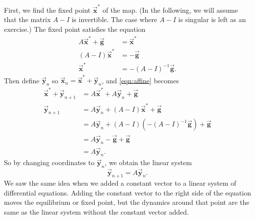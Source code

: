 \documentclass[reqno]{immbook}
\newcommand{\BG}{\vec{\textbf{g}}}
\newcommand{\BX}{\vec{\textbf{x}}}
\newcommand{\BY}{\vec{\textbf{y}}}
\numberwithin{equation}{chapter}
\numberwithin{question}{section}
\numberwithin{theorem}{chapter}
\numberwithin{figure}{chapter}
\theoremstyle{definition}
\begin{document}
First, we find the fixed point $\BX^*$ of the map.
(In the following, we will assume that 
the matrix $A-I$ is invertible.  The case
where $A-I$ is singular is left as an exercise.)
The fixed point satisfies the equation
\begin{equation}
\begin{split}
   A\BX^* + \BG & = \BX^* \\
   (A-I)\BX^* & = -\BG \\
       \BX^* & = -(A-I)^{-1}\BG.
\end{split}
\end{equation}
Then define $\BY_n$ so $\BX_n = \BX^* + \BY_n$,
and \eqref{eqn:affine} becomes
\begin{equation}
\begin{split}
  \BX^* + \BY_{n+1} & = A\BX^* + A\BY_n +\BG \\
  \BY_{n+1} & = A\BY_n + (A-I)\BX^* + \BG \\
            & = A\BY_n + (A-I)\left(-(A-I)^{-1}\BG\right)+\BG \\
	    & = A\BY_n -\BG+\BG \\
	    & = A\BY_n.
\end{split}
\end{equation}
So by changing coordinates to $\BY_n$, we obtain
the linear system
\begin{equation}
  \BY_{n+1} = A\BY_n .
\end{equation}
We saw the same idea when we added a constant vector to a
linear system of differential equations.
Adding the constant vector to the right side of the equation
moves the equilibrium or fixed point, but
the dynamics around that point are the same
as the linear system without the constant vector added.
\end{document}
